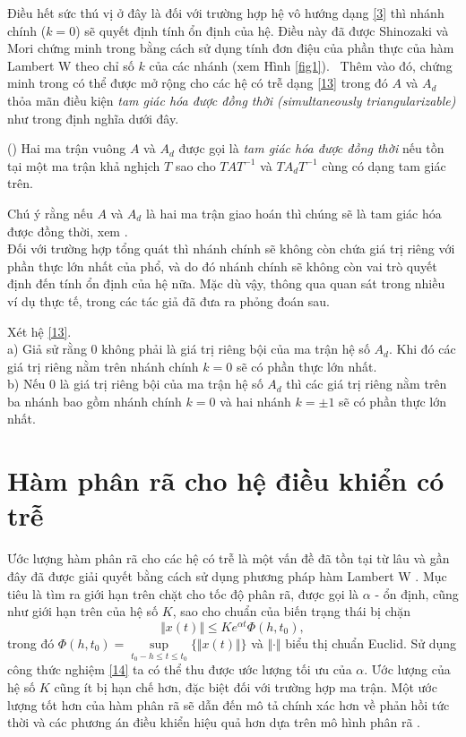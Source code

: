 Điều hết sức thú vị ở đây là đối với trường hợp hệ vô hướng
dạng \eqref{3} thì nhánh chính ($k = 0$) sẽ quyết định tính ổn định của hệ. Điều này đã được Shinozaki và Mori chứng minh trong \cite{Shi06} bằng cách sử dụng tính đơn điệu của phần thực của hàm Lambert W theo chỉ số $k$ của các nhánh (xem Hình \ref{fig1}). \
Thêm vào đó, chứng minh trong \cite{Shi06} có thể được mở rộng cho các hệ có trễ dạng \eqref{13} trong đó $A$ và $A_d$ thỏa mãn điều kiện \emph{tam giác hóa được đồng thời (simultaneously triangularizable)} như trong định nghĩa dưới đây. 
%
\begin{dng}(\cite{RadR00})
Hai ma trận vuông $A$ và $A_d$ được gọi là \emph{tam giác hóa được đồng thời} 
nếu tồn tại một ma trận khả nghịch $T$ sao cho $TAT^{-1}$ và $TA_dT^{-1}$ cùng có dạng tam giác trên.
\end{dng}
%
Chú ý rằng nếu $A$ và $A_d$ là hai ma trận giao hoán thì chúng sẽ là tam giác hóa được đồng thời, xem \cite[Chương 2]{RadR00}.\\
%
\indent Đối với trường hợp tổng quát thì nhánh chính sẽ không còn chứa giá trị riêng với phần thực lớn nhất của phổ, và do đó nhánh chính sẽ không còn vai trò quyết định đến tính ổn định của hệ nữa. 
%
Mặc dù vậy, thông qua quan sát trong nhiều ví dụ thực tế, trong \cite{Yi10} các tác giả đã đưa ra phỏng đoán sau.

\begin{mde}\label{conj}
Xét hệ \eqref{13}. \\
a) Giả sử rằng $0$ không phải là giá trị riêng bội của 
ma trận hệ số $A_d$. Khi đó các giá trị riêng nằm trên nhánh chính $k=0$ sẽ có phần thực lớn nhất. \\
b) Nếu $0$ là giá trị riêng bội của ma trận hệ số $A_d$ thì các giá trị riêng nằm trên ba nhánh bao gồm nhánh chính $k=0$ và hai nhánh $k=\pm 1$ sẽ có phần thực lớn nhất.
\end{mde}


\section{Hàm phân rã cho hệ điều khiển có trễ}
Ước lượng hàm phân rã cho các hệ có trễ là một vấn đề đã tồn tại từ lâu và gần đây đã được giải quyết bằng cách sử dụng phương pháp hàm Lambert W \cite{Du12}. Mục tiêu là tìm ra giới hạn trên chặt cho tốc độ phân rã, được gọi là $\alpha$ - ổn định, cũng như giới hạn trên của hệ số $K$, sao cho chuẩn của biến trạng thái bị chặn 
\begin{equation}\label{17}
\Vert x(t)\Vert\leq Ke^{\alpha t}\Phi(h,t_0),
\end{equation} 
trong đó $\Phi(h,t_0)=\sup\limits_{t_0-h\leq t\leq t_0}\{\Vert x(t)\Vert\}$ và $\Vert \cdot\Vert$ biểu thị chuẩn Euclid. Sử dụng công thức nghiệm \eqref{14} ta có thể thu được ước lượng tối ưu của $\alpha$. Ước lượng của hệ số $K$ cũng ít bị hạn chế hơn, đặc biệt đối với trường hợp ma trận. Một ước lượng tốt hơn của hàm phân rã sẽ dẫn đến mô tả chính xác hơn về phản hồi tức thời và các phương án điều khiển hiệu quả hơn dựa trên mô hình phân rã \cite{Du12}.

